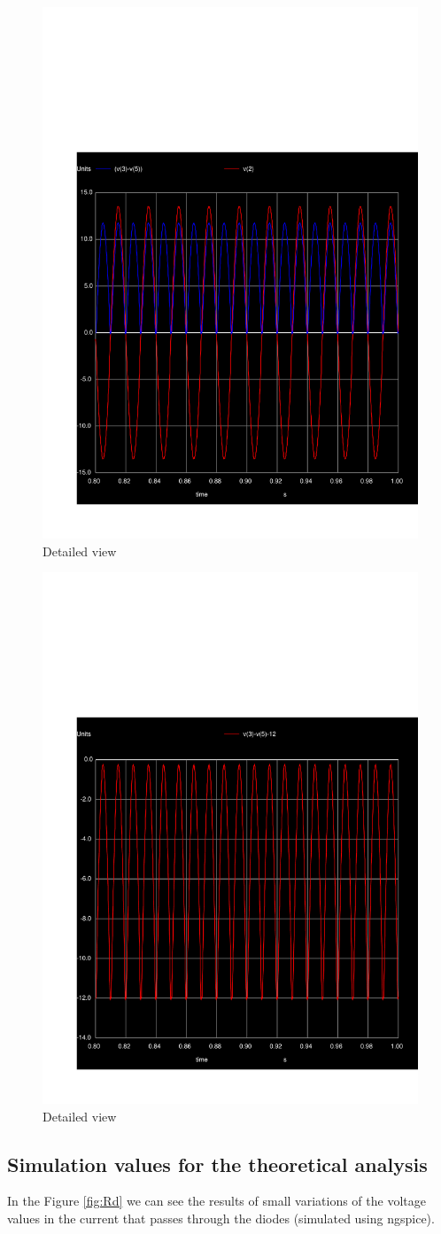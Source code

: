 \begin{figure}[!h]
    \centering
      \includegraphics[width=.45\columnwidth]{../sim/outputvoltage.pdf}
      \caption{Detailed view}
      \label{fig:trans3}
\end{figure}


\begin{figure}[!h]
    \centering
      \includegraphics[width=.45\columnwidth]{../sim/detail.pdf}
      \caption{Detailed view}
      \label{fig:trans3}
\end{figure}

\subsection{Simulation values for the theoretical analysis}

In the Figure \ref{fig:Rd} we can see the results of small variations of the voltage values in the current that passes through the diodes (simulated using ngspice).


